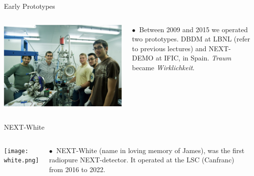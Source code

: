 \documentclass [aspectratio=169]{beamer}
\begin{document}
\begin{frame}{Early Prototypes}

\begin{columns}
\includegraphics[scale=0.28]{next-demo.png}


$\bullet~$ Between 2009 and 2015 we operated two prototypes. DBDM at LBNL (refer to previous lectures) and NEXT-DEMO at IFIC, in Spain. {\em Traum} became {\em Wirklichkeit}.

\end{columns}
\end{frame}

\begin{frame}{NEXT-White}

\begin{columns}
\texttt{[image: white.png]}

$\bullet~$ NEXT-White (name in loving memory of James), was the first radiopure NEXT-detector. It operated at the LSC (Canfranc) from 2016 to 2022.

\end{columns}
\end{frame}
\end{document}
